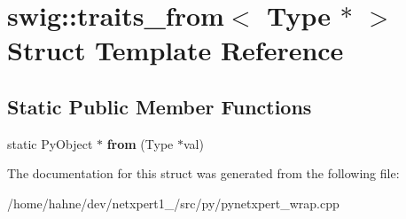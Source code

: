 \hypertarget{structswig_1_1traits__from_3_01Type_01_5_01_4}{}\section{swig\+:\+:traits\+\_\+from$<$ Type $\ast$ $>$ Struct Template Reference}
\label{structswig_1_1traits__from_3_01Type_01_5_01_4}
\subsection*{Static Public Member Functions}
\begin{DoxyCompactItemize}
\item 
static Py\+Object $\ast$ {\bfseries from} (Type $\ast$val)\hypertarget{structswig_1_1traits__from_3_01Type_01_5_01_4_a9df365d214884ed1c08f71211f5925ad}{}\label{structswig_1_1traits__from_3_01Type_01_5_01_4_a9df365d214884ed1c08f71211f5925ad}

\end{DoxyCompactItemize}


The documentation for this struct was generated from the following file\+:\begin{DoxyCompactItemize}
\item 
/home/hahne/dev/netxpert1\+\_/src/py/pynetxpert\+\_\+wrap.\+cpp\end{DoxyCompactItemize}

